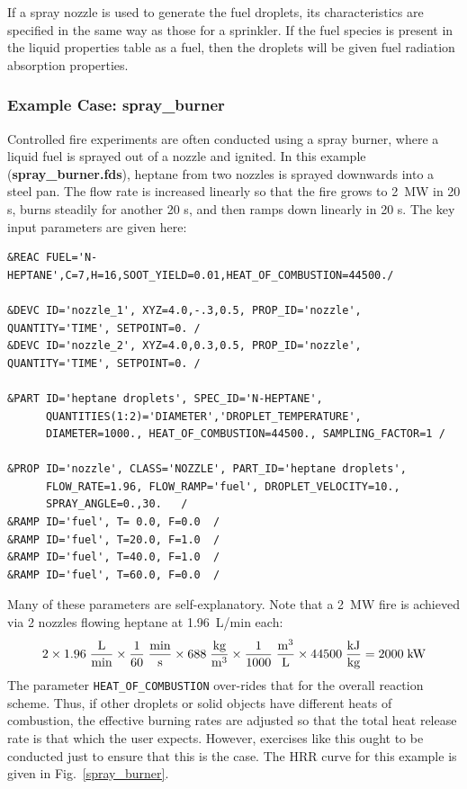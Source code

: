 \documentclass[11pt]{book}
\newcommand{\ct}{\tt\small}
\newcommand{\be}{\begin{equation}}
\newcommand{\ee}{\end{equation}}
\begin{document}
If a spray nozzle is used to generate the fuel droplets, its characteristics are specified
in the same way as those for a sprinkler.  If the fuel species is present in the liquid properties table as a fuel, then the droplets will be given fuel radiation absorption properties.

\subsubsection{Example Case: spray\_burner}

Controlled fire experiments are often conducted using a spray burner,
where a liquid fuel is sprayed out of a nozzle and ignited. In this
example ({\bf spray\_burner.fds}), heptane from two nozzles is
sprayed downwards into a steel pan.  The flow rate is increased
linearly so that the fire grows to 2~MW in 20 s, burns steadily for
another 20 s, and then ramps down linearly in 20 s. The key input
parameters are given here:

\footnotesize
\begin{verbatim}
&REAC FUEL='N-HEPTANE',C=7,H=16,SOOT_YIELD=0.01,HEAT_OF_COMBUSTION=44500./

&DEVC ID='nozzle_1', XYZ=4.0,-.3,0.5, PROP_ID='nozzle', QUANTITY='TIME', SETPOINT=0. /
&DEVC ID='nozzle_2', XYZ=4.0,0.3,0.5, PROP_ID='nozzle', QUANTITY='TIME', SETPOINT=0. /

&PART ID='heptane droplets', SPEC_ID='N-HEPTANE',
      QUANTITIES(1:2)='DIAMETER','DROPLET_TEMPERATURE',
      DIAMETER=1000., HEAT_OF_COMBUSTION=44500., SAMPLING_FACTOR=1 /

&PROP ID='nozzle', CLASS='NOZZLE', PART_ID='heptane droplets',
      FLOW_RATE=1.96, FLOW_RAMP='fuel', DROPLET_VELOCITY=10.,
      SPRAY_ANGLE=0.,30.   /
&RAMP ID='fuel', T= 0.0, F=0.0  /
&RAMP ID='fuel', T=20.0, F=1.0  /
&RAMP ID='fuel', T=40.0, F=1.0  /
&RAMP ID='fuel', T=60.0, F=0.0  /
\end{verbatim}
\normalsize

\noindent
Many of these parameters are self-explanatory. Note that a 2~MW fire is achieved via 2 nozzles flowing heptane at 1.96~L/min each:
\be 2 \times 1.96 \; \frac{\hbox{L}}{\hbox{min}} \times \frac{1}{60} \; \frac{\hbox{min}}{\hbox{s}} \times 688 \;
\frac{\hbox{kg}}{\hbox{m}^3} \times \frac{1}{1000} \; \frac{\hbox{m}^3}{\hbox{L}} \times 44500 \;
\frac{\hbox{kJ}}{\hbox{kg}} = 2000 \; \hbox{kW} \ee
The parameter {\ct HEAT\_OF\_COMBUSTION} over-rides that for the overall
reaction scheme. Thus, if other droplets or solid objects have different
heats of combustion, the effective burning rates are adjusted so that the
total heat release rate is that which the user expects. However, exercises
like this ought to be conducted just to ensure that this is the case.
The HRR curve for this example is given in Fig.~\ref{spray_burner}.
\end{document}
